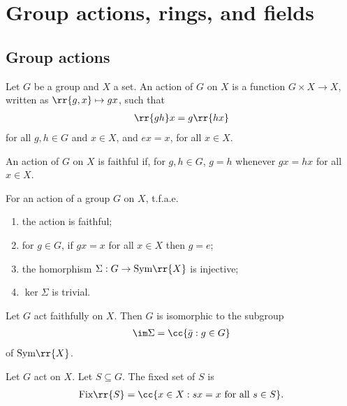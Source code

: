 \documentclass{article}
\begin{document}
\section{Group actions, rings, and fields}

\subsection{Group actions}\label{sec:group_actions}

\begin{definition}
  Let $G$ be a group and $X$ a set. An action of $G$ on $X$ is a function
  $G\times X\to X$, written as $\rr{g,x}\mapsto gx$, such that
  \begin{align*}
    \rr{gh}x=g\rr{hx}
  \end{align*}
  for all $g,h\in G$ and $x\in X$, and $ex=x$, for all $x\in X$.
\end{definition}

\begin{definition}
  An action of $G$ on $X$ is faithful if, for $g,h\in G$,
  $g=h$ whenever $gx = hx$ for all $x\in X$.
\end{definition}

\begin{lemma}
  For an action of a group $G$ on $X$, t.f.a.e.
  \begin{enumerate}
    \item the action is faithful;
    \item for $g\in G$, if $gx=x$ for all $x\in X$ then $g=e$;
    \item the homorphism $\Sigma:G\to\text{Sym}\rr{X}$ is injective;
    \item $\ker\Sigma$ is trivial.
  \end{enumerate}
\end{lemma}

\begin{lemma}
  Let $G$ act faithfully on $X$. Then $G$ is isomorphic to the subgroup
  \begin{align*}
    \im\Sigma = \cc{\bar g : g\in G}
  \end{align*}
  of $\text{Sym}\rr{X}$.
\end{lemma}

\begin{definition}
  Let $G$ act on $X$. Let $S\subseteq G$. The fixed set of $S$ is
  \begin{align*}
    \text{Fix}\rr{S}=\cc{x\in X : sx = x \text{ for all }s\in S}.
  \end{align*}
\end{definition}
\end{document}
